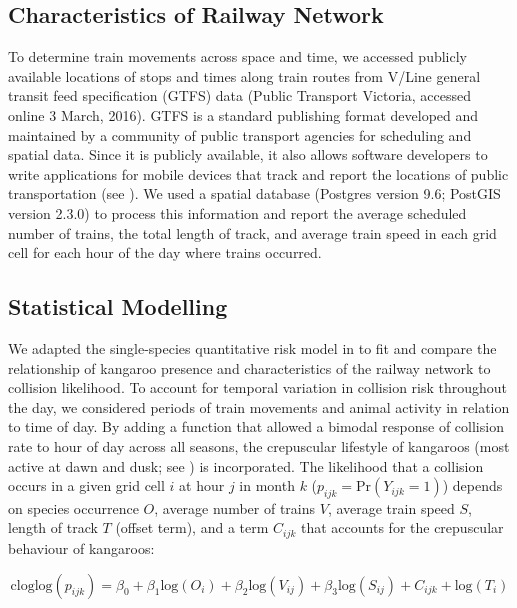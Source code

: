 \subsection{Characteristics of Railway Network}

To determine train movements across space and time, we accessed publicly available locations of stops and times along train routes from V/Line general transit feed specification (GTFS) data (Public Transport Victoria, accessed online 3 March, 2016).  GTFS is a standard publishing format developed and maintained by a community of public transport agencies for scheduling and spatial data.  Since it is publicly available, it also allows software developers to write applications for mobile devices that track and report the locations of public transportation (see \cite{hill11}).  We used a spatial database (Postgres version 9.6; PostGIS version 2.3.0) to process this information and report the average scheduled number of trains, the total length of track, and average train speed in each grid cell for each hour of the day where trains occurred.

\subsection{Statistical Modelling}

We adapted the single-species quantitative risk model in  to fit and compare the relationship of kangaroo presence and characteristics of the railway network to collision likelihood. To account for temporal variation in collision risk throughout the day, we considered periods of train movements and animal activity in relation to time of day. By adding a function that allowed a bimodal response of collision rate to hour of day across all seasons, the crepuscular lifestyle of kangaroos (most active at dawn and dusk; see \cite{daws12}) is incorporated. The likelihood that a collision occurs in a given grid cell $i$ at hour $j$ in month $k$ ($p_{ijk} = \text{Pr}(Y_{ijk}=1)$) depends on species occurrence $O$, average number of trains $V$, average train speed $S$, length of track $T$ (offset term), and a term $C_{ijk}$ that accounts for the crepuscular behaviour of kangaroos:

\begin{equation} \label{eq:51}
\text{cloglog}(p_{ijk})=\beta_0+\beta_1\text{log}(O_i)+\beta_2\text{log}(V_{ij})+\beta_3\text{log}(S_{ij}) + C_{ijk} + \text{log}(T_i)
\end{equation}

